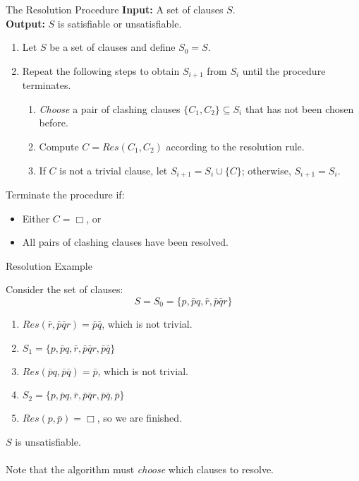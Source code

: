 \documentclass[style=sailor,size=12pt]{powerdot}
\begin{document}
\begin{wideslide}[bm=,toc=]{The Resolution Procedure}
{ \bf Input:} A set of clauses $S$.\\
{ \bf Output:} $S$ is satisfiable or unsatisfiable.\\
\begin{enumerate}
\item<2-> Let $S$ be a set of clauses and define $S_0 = S$.
\item<3-> Repeat the following steps to obtain $S_{i+1}$ from $S_i$ until
the procedure terminates.
\begin{enumerate}
\item<4-> \emph{Choose} a pair of clashing clauses $\{C_1,C_2\} \subseteq S_i$ that
has not been chosen before.
\item<5->Compute $C = Res(C_1,C_2)$ according to the resolution rule.
\item<6->If $C$ is not a trivial clause, let $S_{i + 1} = S_i \cup \{C\}$;
otherwise, $S_{i+1} = S_i$.
\end{enumerate}
\end{enumerate}
\pause[6]
Terminate the procedure if:
\begin{itemize}
\item Either $C = \Box$, or
\item All pairs of clashing clauses have been resolved. 
\end{itemize}

\end{wideslide}

\begin{wideslide}[bm=,toc=]{Resolution Example}
\begin{ex}{4.19}
Consider the set of clauses:
\[
  S  = S_0 = \{p,\bar{p}q,\bar{r},\bar{p}\bar{q}r\}
  \]
\end{ex}
\begin{enumerate}
\item<2-> $Res(\bar{r},\bar{p}\bar{q}r) = \bar{p}\bar{q}$, which is not trivial.
\item<3-> $S_1  = \{p,\bar{p}q,\bar{r},\bar{p}\bar{q}r, \bar{p}\bar{q}\}$
\item<4-> $Res(\bar{p}q,\bar{p}\bar{q}) = \bar{p}$, which is not trivial.
\item<5-> $S_2  = \{p,\bar{p}q,\bar{r},\bar{p}\bar{q}r, \bar{p}\bar{q}, \bar{p}\}$
\item<6-> $Res(p,\bar{p}) = \Box $, so we are finished.
\end{enumerate}
 $S$ is unsatisfiable.\\
\pause ~\\
Note that the algorithm must \emph{choose} which clauses to resolve.
\end{wideslide}
\end{document}

